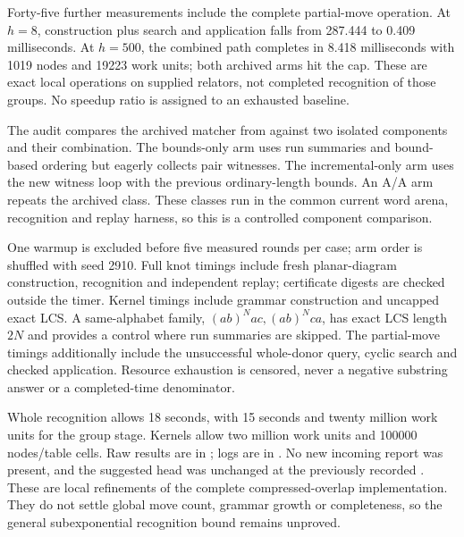 Forty-five further measurements include the complete partial-move operation.
At $h=8$, construction plus search and application falls from 287.444 to
0.409 milliseconds. At $h=500$, the combined path completes in 8.418
milliseconds with 1019 nodes and 19223 work units; both archived arms hit
the cap. These are exact local operations on supplied relators, not
completed recognition of those groups. No speedup ratio is assigned to
an exhausted baseline.


The audit compares the archived matcher from  against
two isolated components and their combination. The bounds-only arm uses
run summaries and bound-based ordering but eagerly collects pair witnesses.
The incremental-only arm uses the new witness loop with the previous
ordinary-length bounds. An A/A arm repeats the archived class. These
classes run in the common current word arena, recognition and replay
harness, so this is a controlled component comparison.

One warmup is excluded before five measured rounds per case; arm order
is shuffled with seed 2910. Full knot timings include fresh planar-diagram
construction, recognition and independent replay; certificate digests are
checked outside the timer. Kernel timings include grammar construction
and uncapped exact LCS. A same-alphabet family,
$(ab)^Nac,(ab)^Nca$, has exact LCS length $2N$ and provides a control
where run summaries are skipped. The partial-move timings additionally
include the unsuccessful whole-donor query, cyclic search and checked
application. Resource exhaustion is censored, never a negative substring
answer or a completed-time denominator.

Whole recognition allows 18 seconds, with 15 seconds and twenty million
work units for the group stage. Kernels allow two million work units and
100000 nodes/table cells. Raw results are in
; logs are in
. No new incoming report was present,
and the suggested  head was unchanged at the previously
recorded . These are local refinements of the complete
compressed-overlap implementation. They do not settle global move count,
grammar growth or completeness, so the general subexponential recognition
bound remains unproved.
